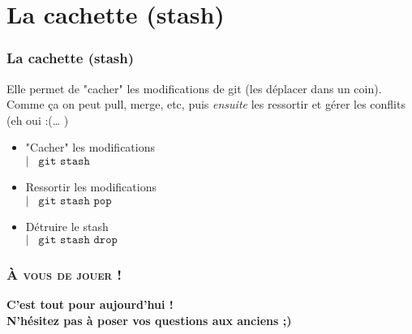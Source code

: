 \documentclass[9pt,a9paper,handout]{beamer}
\newcommand{\command}[1]{$\left|\;\;\;\texttt{#1}\right.$}
\begin{document}
\section{La cachette (stash)}
\begin{frame}
\frametitle{La cachette (stash)}
Elle permet de "cacher" les modifications de git (les déplacer dans un coin). Comme ça on peut pull, merge, etc, puis \emph{ensuite} les ressortir et gérer les conflits (eh oui :(… )
\begin{itemize}
    \item "Cacher" les modifications\\\command{git stash}
    \item Ressortir les modifications\\\command{git stash pop}
    \item Détruire le stash\\\command{git stash drop}
\end{itemize}
\end{frame}


















\begin{frame}
    \frametitle{\textsc{À vous de jouer  !}}
    \begin{center}
    \Large \textbf{C'est tout pour aujourd'hui !\\ N'hésitez pas à poser vos questions aux anciens ;) }
    \end{center}
\end{frame}
\end{document}
